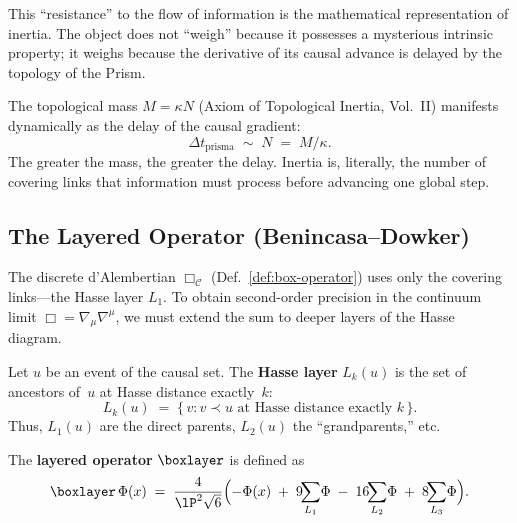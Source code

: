 \noindent
This ``resistance'' to the flow of information is the mathematical
representation of inertia. The object does not ``weigh'' because it
possesses a mysterious intrinsic property; it weighs because the
derivative of its causal advance is delayed by the topology of the
Prism.

\begin{result}[title={The Derivative of Inertia}]
\label{res:inertia-derivative}
The topological mass $M = \kappa N$
(Axiom of Topological Inertia, Vol.~II) manifests
dynamically as the delay of the causal gradient:
\[
  \Delta t_{\text{prisma}} \;\sim\; N \;=\; M/\kappa.
\]
The greater the mass, the greater the delay. Inertia is, literally,
the number of covering links that information must process before
advancing one global step.
\end{result}

\subsection{The Layered Operator (Benincasa--Dowker)}

The discrete d'Alembertian $\Box_{\mathcal{C}}$
(Def.~\ref{def:box-operator}) uses only the covering
links---the Hasse layer $L_1$.  To obtain second-order precision
in the continuum limit $\Box = \nabla_\mu \nabla^\mu$, we must
extend the sum to deeper layers of the Hasse diagram.

\begin{definition}
Let $u$ be an event of the causal set.  The \textbf{Hasse layer}
$L_k(u)$ is the set of ancestors of~$u$ at Hasse distance
exactly~$k$:
\[
  L_k(u) \;=\; \bigl\{\,v : v \prec u
  \text{ at Hasse distance exactly } k\,\bigr\}.
\]
Thus, $L_1(u)$ are the direct parents, $L_2(u)$ the ``grandparents,'' etc.
\end{definition}

\begin{definition}
\label{def:box-layered}
The \textbf{layered operator} $\boxlayer$ is defined as
\begin{equation}
  \boxlayer\,\Phi(x)
  \;=\;
  \frac{4}{\lP^2\sqrt{6}}
  \Bigl(
    -\Phi(x)
    \;+\; 9\!\!\sum_{L_1}\!\Phi
    \;-\; 16\!\!\sum_{L_2}\!\Phi
    \;+\; 8\!\!\sum_{L_3}\!\Phi
  \Bigr).
  \label{eq:box-layered}
\end{equation}
\end{definition}

